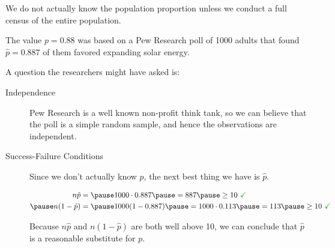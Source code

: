 \documentclass{beamer}
\begin{document}
\begin{frame}
  \begin{example}
    We do not actually know the population proportion unless we conduct a full census of the entire population.\pause

    \vspace{1mm}
    The value $p=0.88$ was based on a Pew Research poll of 1000 adults that found $\hat{p}=0.887$ of them favored expanding solar energy.\pause

    \vspace{1mm}
    A question the researchers might have asked is:

    \vspace{-3mm}
    \begin{center}\small
    \end{center}\pause

    \vspace{-4mm}
    \begin{description}
    \item[Independence] Pew Research is a well known non-profit think tank, so we can believe that the poll is a simple random sample, and hence the observations are independent.\pause
    \item[Success-Failure Conditions] Since we don't actually know $p$, the next best thing we have is $\hat{p}$.

      \vspace{-6.5mm}
      \begin{equation*}
        \begin{aligned}
          n\hat{p} &= \pause
          1000\cdot 0.887\pause
          =887\pause
          \geq 10~{\color{green!70!black}\checkmark} \\\pause
          n(1-\hat{p}) &=\pause
          1000(1-0.887)\pause
          = 1000\cdot 0.113 \pause
          = 113\pause
          \geq 10~{\color{green!70!black}\checkmark}
        \end{aligned}
      \end{equation*}\pause

      \vspace{-4.5mm}
      Because $n\hat{p}$ and $n(1-\hat{p})$ are both well above 10, we can conclude that $\hat{p}$ is a reasonable substitute for $p$.
    \end{description}
  \end{example}
\end{frame}
\end{document}
